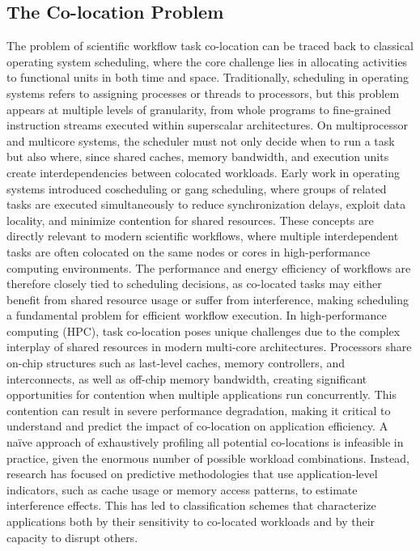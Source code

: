 \subsection{The Co-location Problem}
\label{sec:background_colocation}
The problem of scientific workflow task co-location can be traced back to classical operating system scheduling, where the core challenge lies in allocating activities to functional units in both time and space. Traditionally, scheduling in operating systems refers to assigning processes or threads to processors, but this problem appears at multiple levels of granularity, from whole programs to fine-grained instruction streams executed within superscalar architectures. On multiprocessor and multicore systems, the scheduler must not only decide when to run a task but also where, since shared caches, memory bandwidth, and execution units create interdependencies between colocated workloads. Early work in operating systems introduced coscheduling or gang scheduling, where groups of related tasks are executed simultaneously to reduce synchronization delays, exploit data locality, and minimize contention for shared resources. These concepts are directly relevant to modern scientific workflows, where multiple interdependent tasks are often colocated on the same nodes or cores in high-performance computing environments. The performance and energy efficiency of workflows are therefore closely tied to scheduling decisions, as co-located tasks may either benefit from shared resource usage or suffer from interference, making scheduling a fundamental problem for efficient workflow execution.
In high-performance computing (HPC), task co-location poses unique challenges due to the complex interplay of shared resources in modern multi-core architectures. Processors share on-chip structures such as last-level caches, memory controllers, and interconnects, as well as off-chip memory bandwidth, creating significant opportunities for contention when multiple applications run concurrently. This contention can result in severe performance degradation, making it critical to understand and predict the impact of co-location on application efficiency. A naïve approach of exhaustively profiling all potential co-locations is infeasible in practice, given the enormous number of possible workload combinations. Instead, research has focused on predictive methodologies that use application-level indicators, such as cache usage or memory access patterns, to estimate interference effects. This has led to classification schemes that characterize applications both by their sensitivity to co-located workloads and by their capacity to disrupt others.
